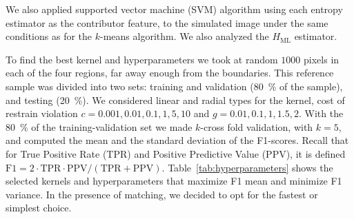 \documentclass[journal]{IEEEtran}
\begin{document}

We also applied supported vector machine (SVM) algorithm using each entropy estimator as the contributor feature, to the simulated image under the same conditions as for the $k$-means algorithm. 
We also analyzed the $H_{\text{ML}}$ estimator.

To find the best kernel and hyperparameters we took at random $1000$ pixels in each of the four regions, far away enough from the boundaries. 
This reference sample was divided into two sets:
training and validation (\SI{80}{\percent} of the sample), and
testing (\SI{20}{\percent}). 
We considered linear and radial types for the kernel, cost of restrain violation $c=0.001, 0.01, 0.1, 1, 5, 10$ and $g=0.01, 0.1, 1, 1.5, 2$. 
With the \SI{80}{\percent} of the training-validation set we made $k$-cross fold validation, with $k=5$, and computed the mean and the standard deviation of the F1-scores. Recall that for True Positive Rate (TPR) and Positive Predictive Value (PPV), it is defined $\textrm{F1}=2 \cdot \textrm{TPR} \cdot \textrm{PPV} / (\textrm{TPR} + \textrm{PPV})$.
Table~\ref{tab:hyperparameters} shows the selected kernels and hyperparameters that maximize F1 mean and minimize F1 variance. 
In the presence of matching, we decided to opt for the fastest or simplest choice.



\end{document}

